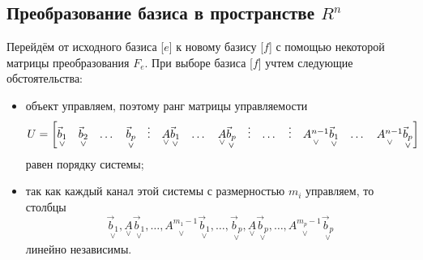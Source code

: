 \subsection{Преобразование базиса в пространстве $R^n$}
Перейдём от исходного базиса [$e$] к новому базису [$f$] с помощью некоторой матрицы преобразования $F_e$.  При выборе базиса [$f$] учтем следующие обстоятельства:
\begin{itemize}
\item объект управляем, поэтому ранг матрицы управляемости
\begin{equation}
	U=
	\setcounter{MaxMatrixCols}{20}
	\begin{bmatrix}
	\underset{\lor}{\vec{b}_1} & \underset{\lor}{\vec{b}_2} & \dots & \underset{\lor}{\vec{b}_p} & \vdots & \underset{\lor}{A}\underset{\lor}{\vec{b}_1} & \dots & \underset{\lor}{A}\underset{\lor}{\vec{b}_p} & \vdots & \dots & \vdots & \underset{\lor}{A^{n-1}}\underset{\lor}{\vec{b}_1} & \dots & \underset{\lor}{A^{n-1}}\underset{\lor}{\vec{b}_p}
	\end{bmatrix}
\end{equation} 
равен порядку системы;
\item так как каждый канал этой системы с размерностью $m_i$ управляем, то столбцы
\begin{equation*}
	\underset{\lor}{\vec{b}_1}, \underset{\lor}{A}\underset{\lor}{\vec{b}_1}, \dots, \underset{\lor}{A^{m_1-1}}\underset{\lor}{\vec{b}_1}, \dots, \underset{\lor}{\vec{b}_p}, \underset{\lor}{A}\underset{\lor}{\vec{b}_p}, \dots,
	\underset{\lor}{A^{m_p-1}}\underset{\lor}{\vec{b}_p}
\end{equation*}
линейно независимы.
\end{itemize}

